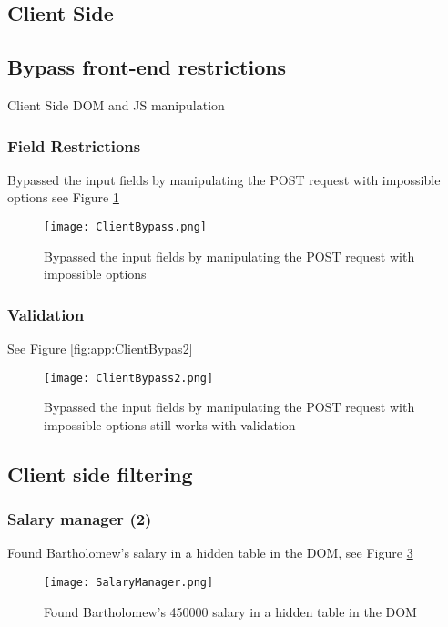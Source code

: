\documentclass[
	letterpaper, %
	10pt, %
	unnumberedsections, %
	twoside, %
]{APAAssignment}
\begin{document}
\begin{appendices}
\section{Client Side}\label{app:ClientSide}

\subsection{Bypass front-end restrictions}
Client Side DOM and JS manipulation

\subsubsection{Field Restrictions}
Bypassed the input fields by manipulating the POST request with impossible options see Figure \ref{fig:app:ClientBypass} 

\begin{figure}[!htp] %
	\centering
	\texttt{[image: ClientBypass.png]}
	\caption{Bypassed the input fields by manipulating the POST request with impossible options}
	\label{fig:app:ClientBypass}
\end{figure}

\subsubsection{Validation}
See Figure \ref{fig:app:ClientBypas2}

\begin{figure}[!htp] %
	\centering
	\texttt{[image: ClientBypass2.png]}
	\caption{Bypassed the input fields by manipulating the POST request with impossible options still works with validation}
	\label{fig:app:ClientBypass2}
\end{figure}

\subsection{Client side filtering}
\subsubsection{Salary manager (2)}
Found Bartholomew's salary in a hidden table in the DOM, see Figure \ref{fig:app:SalaryManager}

\begin{figure}[!htp] %
	\centering
	\texttt{[image: SalaryManager.png]}
	\caption{Found Bartholomew's 450000 salary in a hidden table in the DOM}
	\label{fig:app:SalaryManager}
\end{figure}


\end{appendices}
\end{document}
